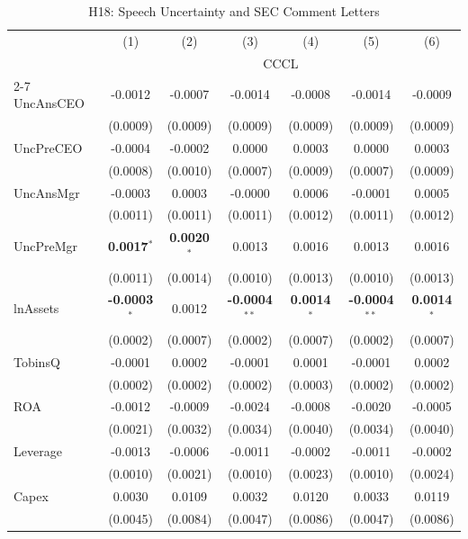 \begin{landscape}
\begin{table}[H]
\setlength{\tabcolsep}{3pt}
\renewcommand{\arraystretch}{0.85}
\centering
\caption{H18: Speech Uncertainty and SEC Comment Letters}
\label{tab:h18}
\scriptsize
\begin{tabular}{lcccccc}
\toprule
 & (1) & (2) & (3) & (4) & (5) & (6) \\
 & \multicolumn{6}{c}{CCCL} \\
\cmidrule(lr){2-7}
\midrule
UncAnsCEO & -0.0012 & -0.0007 & -0.0014 & -0.0008 & -0.0014 & -0.0009 \\
 & (0.0009) & (0.0009) & (0.0009) & (0.0009) & (0.0009) & (0.0009) \\
UncPreCEO & -0.0004 & -0.0002 & 0.0000 & 0.0003 & 0.0000 & 0.0003 \\
 & (0.0008) & (0.0010) & (0.0007) & (0.0009) & (0.0007) & (0.0009) \\
UncAnsMgr & -0.0003 & 0.0003 & -0.0000 & 0.0006 & -0.0001 & 0.0005 \\
 & (0.0011) & (0.0011) & (0.0011) & (0.0012) & (0.0011) & (0.0012) \\
UncPreMgr & \textbf{0.0017}$^{*}$ & \textbf{0.0020}$^{*}$ & 0.0013 & 0.0016 & 0.0013 & 0.0016 \\
 & (0.0011) & (0.0014) & (0.0010) & (0.0013) & (0.0010) & (0.0013) \\
\midrule
lnAssets & \textbf{-0.0003}$^{*}$ & 0.0012 & \textbf{-0.0004}$^{**}$ & \textbf{0.0014}$^{*}$ & \textbf{-0.0004}$^{**}$ & \textbf{0.0014}$^{*}$ \\
 & (0.0002) & (0.0007) & (0.0002) & (0.0007) & (0.0002) & (0.0007) \\
TobinsQ & -0.0001 & 0.0002 & -0.0001 & 0.0001 & -0.0001 & 0.0002 \\
 & (0.0002) & (0.0002) & (0.0002) & (0.0003) & (0.0002) & (0.0002) \\
ROA & -0.0012 & -0.0009 & -0.0024 & -0.0008 & -0.0020 & -0.0005 \\
 & (0.0021) & (0.0032) & (0.0034) & (0.0040) & (0.0034) & (0.0040) \\
Leverage & -0.0013 & -0.0006 & -0.0011 & -0.0002 & -0.0011 & -0.0002 \\
 & (0.0010) & (0.0021) & (0.0010) & (0.0023) & (0.0010) & (0.0024) \\
Capex & 0.0030 & 0.0109 & 0.0032 & 0.0120 & 0.0033 & 0.0119 \\
 & (0.0045) & (0.0084) & (0.0047) & (0.0086) & (0.0047) & (0.0086) \\

\end{tabular}
\end{table}
\end{landscape}
